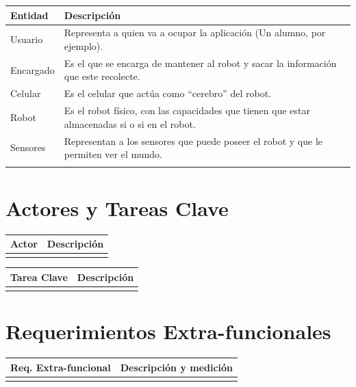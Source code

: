 \documentclass[letterpaper,12pt]{article} %
\numberwithin{equation}{section} %
\numberwithin{figure}{section} %
\numberwithin{table}{section} %
\begin{document}
\begin{table}[hb!]
  \begin{tabular}{lp{7cm}}\hline
    Entidad & Descripci\'on \\ \hline \hline %
    Usuario & Representa a quien va a ocupar la aplicaci\'on (Un alumno, por ejemplo). \\ \hline \hline 
    Encargado & Es el que se encarga de mantener al robot y sacar la informaci\'on que este recolecte. \\ \hline \hline
    Celular & Es el celular que act\'ua como ``cerebro'' del robot. \\ \hline \hline
    Robot & Es el robot f\'isico, con las capacidades que tienen que estar almacenadas si o si en el robot. \\ \hline \hline
    Sensores & Representan a los sensores que puede poseer el robot y que le permiten ver el mundo. \\ \hline \hline
    & \\ \hline
  \end{tabular}
\end{table}

\newpage
\section{Actores y Tareas Clave}

\begin{table}[hb!]
  \begin{tabular}{lp{7cm}}\hline
    Actor & Descripci\'on \\ \hline \hline %
    & \\ \hline    
  \end{tabular}
\end{table}

\begin{table}[hb!]
  \begin{tabular}{lp{7cm}}\hline
    Tarea Clave & Descripci\'on \\ \hline\hline %
    & \\ \hline
  \end{tabular}
\end{table}

\newpage
\section{Requerimientos Extra-funcionales}

\begin{table}[hb!]
  \begin{tabular}{lp{7cm}}\hline 
    Req. Extra-funcional & Descripci\'on y medici\'on \\ \hline\hline %
    & \\ \hline
  \end{tabular}
\end{table}
\end{document}
